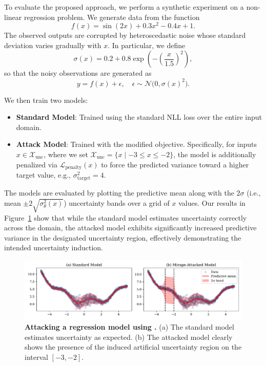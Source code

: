 To evaluate the proposed approach, we perform a synthetic experiment on a non-linear regression problem. We generate data from the function
\begin{equation}
f(x) = \sin(2x) + 0.3x^2 - 0.4x + 1.
\end{equation}
The observed outputs are corrupted by heteroscedastic noise whose standard deviation varies gradually with \(x\). In particular, we define
\begin{equation}
\sigma(x) = 0.2 + 0.8 \exp\left(-\left(\frac{x}{1.5}\right)^2\right),
\end{equation}
so that the noisy observations are generated as
\begin{equation}
y = f(x) + \epsilon, \quad \epsilon \sim \mathcal{N}\bigl(0, \sigma(x)^2\bigr).
\end{equation}

We then train two models:
\begin{itemize}
    \item \textbf{Standard Model}: Trained using the standard NLL loss over the entire input domain.
    \item \textbf{Attack Model}: Trained with the modified objective. Specifically, for inputs \(x \in \mathcal{X}_{\text{unc}}\), where we set \(\mathcal{X}_{\text{unc}} = \{ x \mid -3 \le x \le -2 \}\), the model is additionally penalized via \(\mathcal{L}_{\text{penalty}}(x)\) to force the predicted variance toward a higher target value, e.g., \(\sigma^2_{\text{target}} = 4\).
\end{itemize}
The models are evaluated by plotting the predictive mean along with the \(2\sigma\) (i.e., mean \(\pm 2 \sqrt{\sigma^2_\theta(x)}\)) uncertainty bands over a grid of \(x\) values. Our results in Figure~\ref{fig:reg} show that while the standard model estimates uncertainty correctly across the domain, the attacked model exhibits significantly increased predictive variance in the designated uncertainty region, effectively demonstrating the intended uncertainty induction.

\begin{figure}[t]
    \centering
    \includegraphics[width=\linewidth]{figs/confidential_guardian/regression.pdf}
    \vspace{-20pt}
    \caption[Attacking a regression model using \attack.]{\textbf{Attacking a regression model using \attack.} (a) The standard model estimates uncertainty as expected. (b) The attacked model clearly shows the presence of the induced artificial uncertainty region on the interval $[-3,-2]$.}
    \label{fig:reg}
\end{figure}

